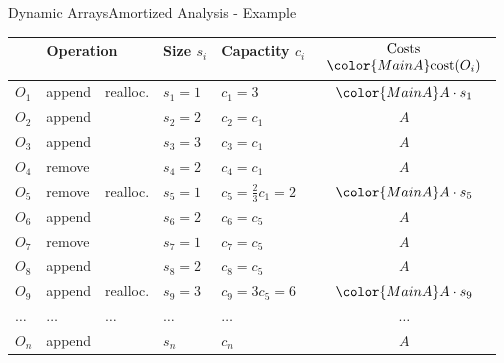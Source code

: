 \begin{frame}{Dynamic Arrays}{Amortized Analysis - Example}
  \vspace*{-1.0em}
  \begin{table}[!h]
    \label{tab:amortized_analysis_introduction}%
    \begin{tabular}{|l|l|l|l|l|c|}
      \bottomrule
      \multicolumn{3}{|c|}{Operation} &
      Size {\color{MainA}$s_i$} &
      Capactity {\color{MainA}$c_i$} &
      $\begin{array}{c}
        \text{Costs}\\
        {\color{MainA}\mathrm{cost}(O_i)}
      \end{array}$\\
      \toprule
      $O_1$ & append & {\color{MainA}realloc.} &
      $s_1 = 1$ & {\color{MainA}$c_1 = 3$} &
      ${\color{MainA}A \cdot s_1}$\\
      $O_2$ & append & {} &
      $s_2 = 2$ & $c_2 = c_1$ & $A$\\
      $O_3$ & append & {} &
      $s_3 = 3$ & $c_3 = c_1$ & $A$\\
      $O_4$ & remove & {} &
      $s_4 = 2$ & $c_4 = c_1$ & $A$\\
      \midrule
      $O_5$ & remove & {\color{MainA}realloc.} &
      $s_5 = 1$ & {\color{MainA}$c_5 = \frac{2}{3} c_1 = 2$} &
      ${\color{MainA}A \cdot s_5}$\\
      $O_6$ & append & {} &
      $s_6 = 2$ & $c_6 = c_5$ & $A$\\
      $O_7$ & remove & {} &
      $s_7 = 1$ & $c_7 = c_5$ & $A$\\
      $O_8$ & append & {} &
      $s_8 = 2$ & $c_8 = c_5$ & $A$\\
      \midrule
      $O_9$ & append & {\color{MainA}realloc.} &
      $s_9 = 3$ & {\color{MainA}$c_9 = 3 c_5 = 6$} &
      ${\color{MainA}A \cdot s_9}$\\
      $\dots$ & $\dots$ & $\dots$ & $\dots$ & $\dots$ & $\dots$\\
      $O_n$ & append & {} &
      $s_n$ & $c_n$ & $A$\\
      \bottomrule
    \end{tabular}
  \end{table}
\end{frame}


